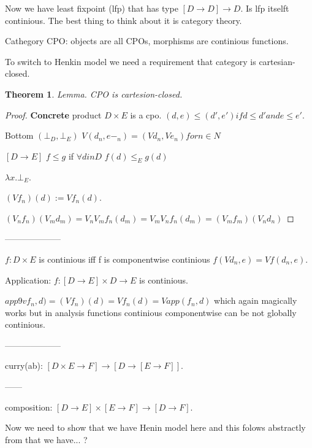 \documentclass[a4paper,10pt]{book}
\newtheorem{theorem}{Theorem}
\newcommand{\rarr}{ \rightarrow }
\begin{document}
Now we have least fixpoint (lfp) that has type $[D\rarr D] \rarr D$. Is lfp itselft continious.
The best thing to think about it is category theory.

Cathegory CPO: objects are all CPOs, morphisms are continious functions.

To switch to Henkin model we need a requirement that category is cartesian-closed.

\begin{theorem}
Lemma. CPO is cartesion-closed. 
\end{theorem}
\begin{proof}
 \textbf{Concrete} product  $D\times E$ is a cpo. $(d,e) \leq (d',e') if d\leq d' and e\leq e'$.
 
 Bottom $(\bot_D,\bot_E)$ $V(d_n,e-_n) = (Vd_n,Ve_n) for n \in N$

 
 $[D\rarr E]$   $f\leq g$ if $\forall d in D$ $f(d) \leq_E g(d)$
 
 $\lambda x . \bot_E$.
 
 $(V f_n)(d) := Vf_n(d)$.
 
 $(V_nf_n)(V_md_m) = V_nV_m f_n(d_m) = V_mV_n f_n(d_m) = (V_mf_m)(V_nd_n)$
\end{proof}
 
 --------------------
 
 $f: D \times E$ is continious iff f is componentwise continious $f(Vd_n, e) = Vf(d_n,e)$.
 
 Application: $f: [D \rarr E] \times D \rarr E$ is continious.
 
 $app 9vf_n,d) = (Vf_n)(d) = Vf_n(d) = Vapp(f_n,d)$ which again magically works but in 
 analysis functions continious componentwise can be not globally continious.
 
 --------------------

 curry(ab): $[D\times E \rarr F] \rarr [D\rarr [E\rarr F]]$.
 
 ------

 composition: $[D\rarr E] \times [E \rarr F] \rarr [D\rarr F]$.
 
 
 Now we need to show that we have Henin model here and this folows abstractly from that we  have... ?
 
\end{document}
